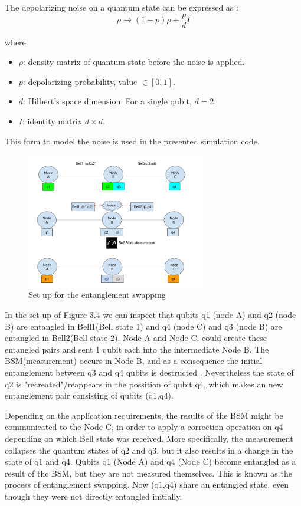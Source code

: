 \documentclass[12pt,a4paper] {report}
\begin{document}
		The depolarizing noise on a quantum state can be expressed as \cite{depolar2}:
			\[
			\rho \to (1-p)\rho + \frac{p}{d}I
			\]

		where:

		\begin{itemize}
			    \item \( \rho \): density matrix of quantum state before the noise is applied.
			    \item \( p \): depolarizing probability,  value \(\in [0, 1]\).
			    \item \( d \): Hilbert's space dimension. For a single qubit, \( d = 2 \).
			    \item \( I \): identity matrix \( d \times d \).
		\end{itemize}

		This form to model the noise is used in the presented simulation code.
	
		\begin{figure}[h!]
			\centering
			\includegraphics[width=0.7\textwidth]{repeater/entanglement_swap.png}
			\caption{Set up for the entanglement swapping}
			\label{fig:}
		\end{figure}		

		In the set up of Figure 3.4 we can inspect that qubits q1 (node A) and q2 (node B) are
		entangled in Bell1(Bell state 1) and q4 (node C) and q3 (node B) are entangled in Bell2(Bell state 2).
		Node A and Node C, could create these entangled pairs and sent 1 qubit each into the intermediate
		Node B. The BSM(measurement) occurs in Node B, and as a consequence the initial entanglement between
		q3 and q4 qubits is destructed \cite{rfc}. Nevertheless the state of q2 is "recreated"/reappears in the possition
		of qubit q4, which makes an new entanglement pair consisting of qubits (q1,q4).

		Depending on the application requirements, the results of the BSM might be communicated to the Node C, in order
		to apply a correction operation on q4 depending on which Bell state was received. More specifically, the measurement
		collapses the quantum states of q2 and q3, but it also results in a change in the state of q1 and q4.
		Qubits q1 (Node A) and q4 (Node C) become entangled as a result of the BSM, but they are not measured themselves.
		This is known as the process of entanglement swapping. Now (q1,q4) share an entangled state, even though they 
		were not directly entangled initially.
\end{document}
